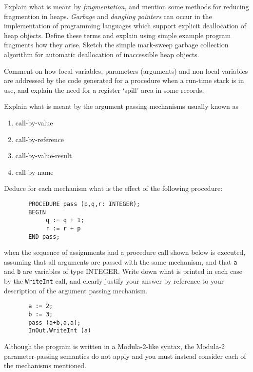 \begin{questions}
\begin{subquestions}
\subquestion
Explain what is 
meant by {\em fragmentation}, and mention some methods
for reducing fragmention in heaps.  
{\em Garbage\/} and {\em dangling pointers}
can occur in the implementation of programming languages which
support explicit deallocation of heap objects. Define
these terms and explain using simple example program
fragments how they arise.
Sketch the simple mark-sweep garbage collection algorithm
for automatic deallocation of inaccessible heap objects.

\end{subquestions}

 
\question

\begin{subquestions}

\subquestion

Comment on how local variables,
parameters (arguments) and non-local variables
are addressed by the code generated for a
procedure when a run-time stack is in use,
and explain the need for a register `spill' area
in some records.


\subquestion

Explain what is meant by the argument passing mechanisms usually
        known as
                \begin{enumerate}
                \item call-by-value
                \item call-by-reference
                \item call-by-value-result
                \item call-by-name
                \end{enumerate}
        Deduce for each mechanism what is the effect of
        the following procedure:
\begin{verbatim}
       PROCEDURE pass (p,q,r: INTEGER);
       BEGIN
            q := q + 1;
            r := r + p
       END pass;
\end{verbatim}   
        when the sequence of assignments and a procedure call
        shown below is executed, assuming that all arguments are
        passed with the same mechanism, and that \verb"a" and
        \verb"b" are variables of type INTEGER.
        Write down what is printed in each case by the \verb"WriteInt"
        call, and clearly justify your answer by reference to your
        description of the argument passing mechanism.
\begin{verbatim}
       a := 2;
       b := 3;
       pass (a+b,a,a);
       InOut.WriteInt (a)
\end{verbatim}
Although the program is written in a Modula-2-like syntax, 
the Modula-2 parameter-passing semantics do not apply and you must
instead consider each of the mechanisms mentioned.


\end{subquestions}
\end{questions}
